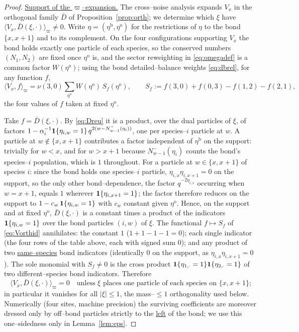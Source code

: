 \documentclass[11pt]{article}
\theoremstyle{plain}
\theoremstyle{definition}
\theoremstyle{remark}
\begin{document}
\begin{proof}
\underline{Support of the $\varpi$--expansion.} The cross--noise analysis expands $V_x$ in the
orthogonal family $\bar D$ of Proposition~\ref{prop:orth}; we determine which $\xi$ have
$\langle V_x,\bar D(\xi,\cdot)\rangle_\varpi\ne0$. Write
$\eta=(\eta^{\mathrm b},\eta^{\mathrm o})$ for the restrictions of $\eta$ to the bond
$\{x,x+1\}$ and to its complement. On the four configurations supporting $V_x$ the bond
holds exactly one particle of each species, so the conserved numbers $(N_1,N_2)$ are
fixed once $\eta^{\mathrm o}$ is, and the sector reweighting in \eqref{eq:omegadef} is a
common factor $W(\eta^{\mathrm o})$; using the bond detailed--balance weights
\eqref{eq:dbrel}, for any function $f$,
\begin{equation}\label{eq:Vorthid}
  \langle V_x,f\rangle_\varpi=\nu(3,0)\sum_{\eta^{\mathrm o}}W(\eta^{\mathrm o})\,
  S_f(\eta^{\mathrm o}),\qquad
  S_f:=f(3,0)+f(0,3)-f(1,2)-f(2,1),
\end{equation}
the four values of $f$ taken at fixed $\eta^{\mathrm o}$.

Take $f=\bar D(\xi,\cdot)$. By \eqref{eq:Dreu} it is a product, over the dual particles of
$\xi$, of factors $1-\alpha_i^{-1}\mathbf 1\{\eta_{i,w}=1\}\,q^{2(w-N^-_{w-1}(\eta_i))}$, one
per species--$i$ particle at $w$. A particle at $w\notin\{x,x+1\}$ contributes a factor
independent of $\eta^{\mathrm b}$ on the support: trivially for $w<x$, and for $w>x+1$
because $N^-_{w-1}(\eta_i)$ counts the bond's species--$i$ population, which is $1$
throughout. For a particle at $w\in\{x,x+1\}$ of species $i$: since the bond holds one
species--$i$ particle, $\eta_{i,x}\eta_{i,x+1}=0$ on the support, so the only other
bond--dependence, the factor $q^{-2\eta_{i,x}}$ occurring when $w=x+1$, equals $1$
wherever $\mathbf 1\{\eta_{i,x+1}=1\}$; the factor therefore reduces on the support to
$1-c_w\,\mathbf 1\{\eta_{i,w}=1\}$ with $c_w$ constant given $\eta^{\mathrm o}$. Hence, on the
support and at fixed $\eta^{\mathrm o}$, $\bar D(\xi,\cdot)$ is a constant times a product
of the indicators $\mathbf 1\{\eta_{i,w}=1\}$ over the bond particles $(i,w)$ of $\xi$.
The functional $f\mapsto S_f$ of \eqref{eq:Vorthid} annihilates: the constant $1$
($1+1-1-1=0$); each single indicator (the four rows of the table above, each with signed
sum $0$); and any product of two \underline{same--species} bond indicators (identically $0$ on
the support, as $\eta_{i,x}\eta_{i,x+1}=0$). The sole monomial with $S_f\ne0$ is the
cross product $\mathbf 1\{\eta_{1,\cdot}=1\}\mathbf 1\{\eta_{2,\cdot}=1\}$ of two
different--species bond indicators. Therefore
\[
  \langle V_x,\bar D(\xi,\cdot)\rangle_\varpi=0
  \quad\text{unless $\xi$ places one particle of each species on $\{x,x+1\}$;}
\]
in particular it vanishes for all $|\xi|\le1$, the mass--$\le1$ orthogonality used below.
Numerically (four sites, machine precision) the surviving coefficients are moreover
dressed only by off--bond particles strictly to the \underline{left} of the bond; we use this
one--sidedness only in Lemma~\ref{lem:eps}.
\end{proof}
\end{document}
